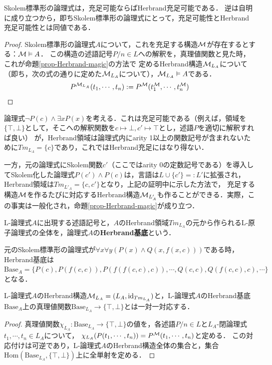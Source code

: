 \documentclass[uplatex,dvipdfmx]{jsarticle}
\begin{document}
\begin{proposition}
    Skolem標準形の論理式は，充足可能ならばHerbrand充足可能である．
    逆は自明に成り立つから，即ちSkolem標準形の論理式にとって，充足可能性とHerbrand充足可能性とは同値である．
\end{proposition}
\begin{proof}
    Skolem標準形の論理式$A$について，これを充足する構造$\mathcal{M}$が存在するとする：$\mathcal{M}\vDash A$．
    この構造の述語記号$P/n\in L$への解釈を，真理値関数と見た時，これが命題\ref{prop-Herbrand-magic}の方法で
    定めるHerbrand構造$\mathcal{M}_{L_A}$について（即ち，次の式の通りに定めた$\mathcal{M}_{L_A}$について），$\mathcal{M}_{L_A}\vDash A$である．
    \[ P^{\mathcal{M}_{L_A}}(t_1,\cdots,t_n) := P^{\mathcal{M}}(t_1^{\mathcal{M}},\cdots,t_n^{\mathcal{M}}) \]
\end{proof}
\begin{example}
    論理式$\lnot P(c)\land\exists xP(x)$を考える．これは充足可能である（例えば，領域を$\{\top,\bot\}$として，そこへの解釈関数を$c\mapsto\bot,c'\mapsto\top$とし，述語$P$を適切に解釈すれば良い）
    が，Herbrand領域は論理式内にarity 1以上の関数記号が含まれないために$Tm_{L_A}=\{c\}$であり，これではHerbrand充足にはなり得ない．
    
    一方，元の論理式にSkolem関数$c'$（ここではarity 0の定数記号である）を導入してSkolem化した論理式$P(c')\land P(c)$は，言語は$L\cup\{c'\}=:L'$に拡張され，Herbrand領域は$Tm_{L'_A}=\{c,c'\}$となり，上記の証明中に示した方法で，
    充足する構造$\mathcal{M}$を作るたびに対応するHerbrand構造$\mathcal{M}_{L'_A}$も作ることができる．実際，この事実は一般化され，命題\ref{prop-Herbrand-magic}が成り立つ．
\end{example}

\begin{definition}
    L-論理式$A$に出現する述語記号と，$A$のHerbrand領域$Tm_{L_A}$の元から作られるL-原子論理式の全体を，論理式$A$の\textbf{Herbrand基底}という．
\end{definition}
\begin{example}
    元のSkolem標準形の論理式が$\forall x\forall y(P(x)\land Q(x,f(x,c)))$である時，Herbrand基底は$\mathrm{Base}_A=\{P(c),P(f(c,c)),P(f(f(c,c),c)),\cdots,Q(c,c),Q(f(c,c),c),\cdots\}$となる．
\end{example}

\begin{proposition}[Herbrand構造と付値]\label{prop-Herbrand-magic}
    L-論理式$A$のHerbrand構造$\mathcal{M}_{L_A}=(L_A,\mathrm{id}_{Tm_{L_A}})$と，L-論理式$A$のHerbrand基底$\mathrm{Base}_{A}$上の真理値関数$\mathrm{Base}_{L_A}\to\{\top,\bot\}$とは一対一対応する．
\end{proposition}
\begin{proof}
    真理値関数$\chi_{L_A}:\mathrm{Base}_{L_A}\to\{\top,\bot\}$の値を，各述語$P/n\in L$と$L_A$-閉論理式$t_1,\cdots,t_n\in L_A$について，
    $\chi_{L_A}(P(t_1,\cdots,t_n))=P^{\mathcal{M}}(t_1,\cdots,t_n)$と定める．
    この対応付けは可逆であり，L-論理式$A$のHerbrand構造全体の集合と，集合$\mathrm{Hom}(\mathrm{Base}_{L_A},\{\top,\bot\})$上に全単射を定める．
\end{proof}
\end{document}
